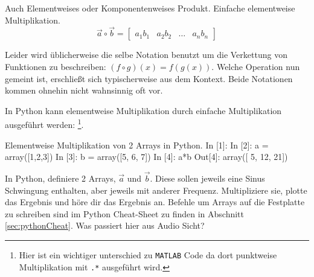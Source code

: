 Auch Elementweises oder Komponentenweises Produkt. Einfache elementweise Multiplikation.
$$ \vec{a}\circ \vec{b} = \begin{bmatrix}a_1b_1 & a_2b_2 & \dots & a_n b_n\end{bmatrix}$$ 

Leider wird üblicherweise die selbe Notation benutzt um die Verkettung von Funktionen zu beschreiben: $(f \circ g)(x) = f(g(x))$. Welche Operation nun gemeint ist, erschließt sich typischerweise aus dem Kontext. Beide Notationen kommen ohnehin nicht wahnsinnig oft vor.

In Python kann elementweise Multiplikation durch einfache Multiplikation ausgeführt werden: \footnote{Hier ist ein wichtiger unterschied zu \texttt{MATLAB} Code da dort punktweise Multiplikation mit \texttt{.*} ausgeführt wird.}.

\begin{python}{Elementweise Multiplikation von 2 Arrays in Python.}
In [1]: %
In [2]: a = array([1,2,3])
In [3]: b = array([5, 6, 7])
In [4]: a*b
Out[4]: array([ 5, 12, 21])
\end{python}

\begin{question}
In Python, definiere 2 Arrays, $\vec{a}$ und $\vec{b}$. Diese sollen jeweils eine Sinus Schwingung enthalten, aber jeweils mit anderer Frequenz. Multipliziere sie, plotte das Ergebnis und höre dir das Ergebnis an. Befehle um Arrays auf die Festplatte zu schreiben sind im Python Cheat-Sheet zu finden in Abschnitt \ref{sec:pythonCheat}. Was passiert hier aus Audio Sicht?
\end{question}

